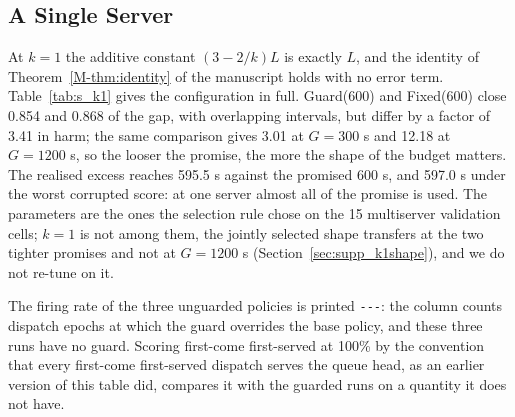 \documentclass[mathematics,supfile,submit,moreauthors]{Definitions/mdpi}
\newcommand{\devnum}[1]{#1}
\begin{document}

\subsection{A Single Server}

At $k = 1$ the additive constant $(3 - 2/k)L$ is exactly $L$, and the identity of
Theorem~\ref*{M-thm:identity} of the manuscript holds with no error term.
Table~\ref{tab:s_k1} gives the configuration in full. Guard($\devnum{600}$) and
Fixed($\devnum{600}$) close \devnum{0.854} and \devnum{0.868} of the gap, with overlapping
intervals, but differ by a factor of \devnum{3.41} in harm; the same comparison gives
\devnum{3.01} at $G = \devnum{300}$ s and \devnum{12.18} at $G = \devnum{1200}$ s, so the
looser the promise, the more the shape of the budget matters. The realised excess reaches
\devnum{595.5} s against the promised \devnum{600} s, and \devnum{597.0} s under the worst
corrupted score: at one server almost all of the promise is used. The parameters are the
ones the selection rule chose on the \devnum{15} multiserver validation cells; $k = 1$ is
not among them, the jointly selected shape transfers at the two tighter promises and not
at $G = \devnum{1200}$ s (Section~\ref{sec:supp_k1shape}), and we do not re-tune on it.

The firing rate of the three unguarded policies is printed \verb|---|: the column counts
dispatch epochs at which the guard overrides the base policy, and these three runs have no
guard. Scoring first-come first-served at \devnum{100\%} by the convention that every
first-come first-served dispatch serves the queue head, as an earlier version of this
table did, compares it with the guarded runs on a quantity it does not have.
\end{document}
